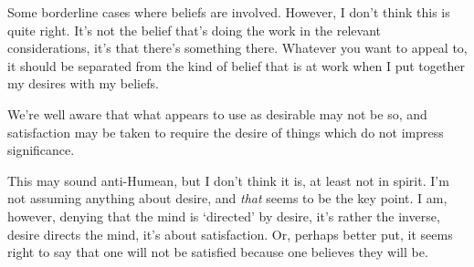 \documentclass[10pt]{article}
\begin{document}
Some borderline cases where beliefs are involved.
However, I don't think this is quite right.
It's not the belief that's doing the work in the relevant considerations, it's that there's something there.
Whatever you want to appeal to, it should be separated from the kind of belief that is at work when I put together my desires with my beliefs.

We're well aware that what appears to use as desirable may not be so, and satisfaction may be taken to require the desire of things which do not impress significance.

This may sound anti-Humean, but I don't think it is, at least not in spirit.
I'm not assuming anything about desire, and \emph{that} seems to be the key point.
I am, however, denying that the mind is `directed' by desire, it's rather the inverse, desire directs the mind, it's about satisfaction.
Or, perhaps better put, it seems right to say that one will not be satisfied because one believes they will be.











\nocite{Bratman:1981aa,Bratman:1987aa,Bratman:2003aa,Chislenko:2016aa,Kaplan:1989aa,McDaniel:2008aa,Nottelmann:2011aa,Perry:1993aa,Rescher:1960aa,Schapiro:2014aa,Schroeder:2006aa,Schroeder:2007aa,Schroeder:2017aa,Sinhababu:2013aa,Sinhababu:2017aa,Smith:2004aa,Velleman:2000aa,Velleman:2007aa}




\newpage
\printbibliography
\end{document}
